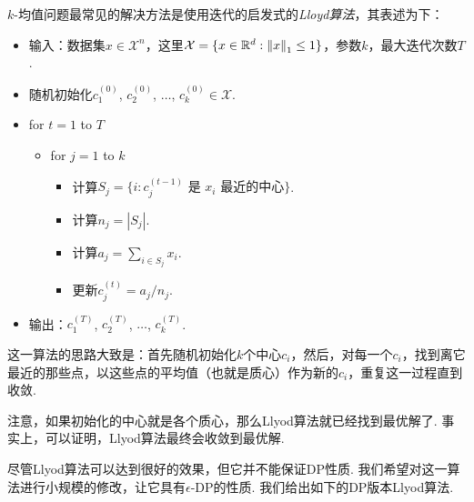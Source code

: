 $k$-均值问题最常见的解决方法是使用迭代的启发式的\textit{Lloyd算法}，其表述为下：
\begin{itemize}
    \item 输入：数据集$x \in \mathcal X^n$，这里$\mathcal X = \{x \in \mathbb{R}^d : \left\|x\right\|_1 \leq 1 \}$，参数$k$，最大迭代次数$T$.
    \item 随机初始化$c_1^{(0)}$, $c_2^{(0)}$, $\dots$, $c_k^{(0)} \in \mathcal X$.
    \item for $t=1$ to $T$
    \begin{itemize}
        \item for $j=1$ to $k$
        \begin{itemize}
            \item 计算$S_j = \{i : c_{j}^{(t-1)} \text{ 是\ } x_i \text{ 最近的中心}\}$.
            \item 计算$n_j = |S_j|$.
            \item 计算$a_j = \sum_{i\in S_j} x_i$.
            \item 更新$c_j^{(t)} = a_j/n_j$.
        \end{itemize}
    \end{itemize}
    \item 输出：$c_1^{(T)}$, $c_2^{(T)}$, $\dots$, $c_k^{(T)}$.
\end{itemize}

这一算法的思路大致是：首先随机初始化$k$个中心$c_i$，然后，对每一个$c_i$，找到离它最近的那些点，以这些点的平均值（也就是质心）作为新的$c_i$，重复这一过程直到收敛.

注意，如果初始化的中心就是各个质心，那么Llyod算法就已经找到最优解了. 事实上，可以证明，Llyod算法最终会收敛到最优解. 

尽管Llyod算法可以达到很好的效果，但它并不能保证DP性质. 我们希望对这一算法进行小规模的修改，让它具有$\epsilon$-DP的性质. 我们给出如下的DP版本Llyod算法.

